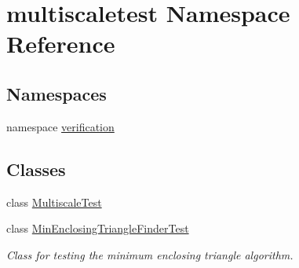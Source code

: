 \hypertarget{namespacemultiscaletest}{\section{multiscaletest \-Namespace \-Reference}
\label{namespacemultiscaletest}
}
\subsection*{\-Namespaces}
\begin{DoxyCompactItemize}
\item 
namespace \hyperlink{namespacemultiscaletest_1_1verification}{verification}
\end{DoxyCompactItemize}
\subsection*{\-Classes}
\begin{DoxyCompactItemize}
\item 
class \hyperlink{classmultiscaletest_1_1MultiscaleTest}{\-Multiscale\-Test}
\item 
class \hyperlink{classmultiscaletest_1_1MinEnclosingTriangleFinderTest}{\-Min\-Enclosing\-Triangle\-Finder\-Test}
\begin{DoxyCompactList}\small\item\em \-Class for testing the minimum enclosing triangle algorithm. \end{DoxyCompactList}\end{DoxyCompactItemize}

